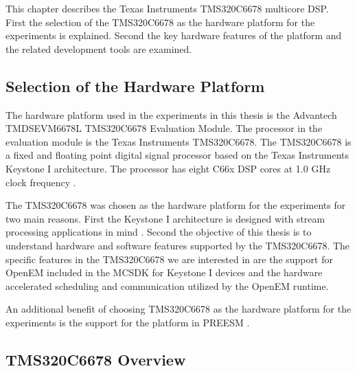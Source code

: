 This chapter describes the Texas Instruments TMS320C6678 multicore DSP. First the selection of the TMS320C6678 as the hardware platform for the experiments is explained. Second the key hardware features of the platform and the related development tools are examined.

\subsection{Selection of the Hardware Platform}
The hardware platform used in the experiments in this thesis is the Advantech TMDSEVM6678L TMS320C6678 Evaluation Module. The processor in the evaluation module is the Texas Instruments TMS320C6678. The TMS320C6678 is a fixed and floating point digital signal processor based on the Texas Instruments Keystone I architecture. The processor has eight C66x DSP cores at 1.0 GHz clock frequency \cite{tmsdatasheet}. 

The TMS320C6678 was chosen as the hardware platform for the experiments for two main reasons. First the Keystone I architecture is designed with stream processing applications in mind \cite{multicorevideo}. Second the objective of this thesis is to understand hardware and software features supported by the TMS320C6678. The specific features in the TMS320C6678 we are interested in are the support for OpenEM included in the MCSDK for Keystone I devices \cite{MCSDKbrochure} and the hardware accelerated scheduling and communication utilized by the OpenEM runtime. 

An additional benefit of choosing TMS320C6678 as the hardware platform for the experiments is the support for the platform in PREESM \cite{pelcat2014preesm}.  

\subsection{TMS320C6678 Overview}

